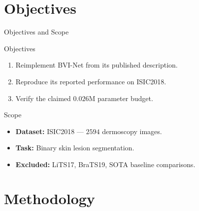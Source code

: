 \documentclass[11pt]{beamer}
\begin{document}
\section{Objectives}

\begin{frame}{Objectives and Scope}
    \begin{block}{Objectives}
    \begin{enumerate}
        \item Reimplement BVI-Net from its published description.
        \item Reproduce its reported performance on ISIC2018.
        \item Verify the claimed $0.026$M parameter budget.
    \end{enumerate}
    \end{block}

    \bigskip

    \begin{block}{Scope}
    \begin{itemize}
        \item \textbf{Dataset:} ISIC2018 --- $2594$ dermoscopy images.
        \item \textbf{Task:} Binary skin lesion segmentation.
        \item \textbf{Excluded:} LiTS17, BraTS19, SOTA baseline comparisons.
    \end{itemize}
    \end{block}
\end{frame}


\section{Methodology}
\end{document}
